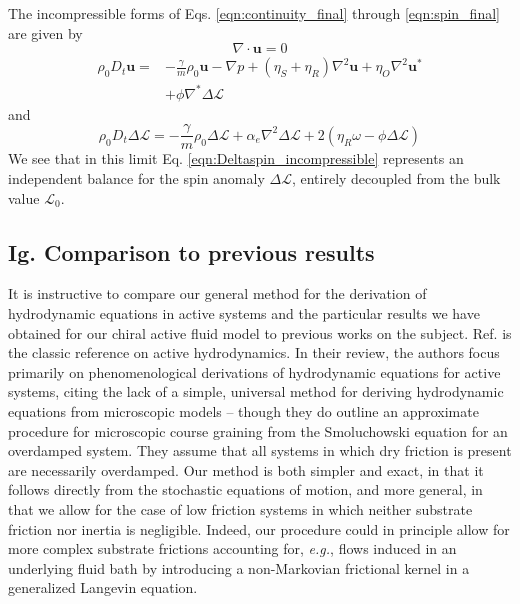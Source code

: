 \documentclass[%
 reprint,
superscriptaddress,
longbibliography,
 amsmath,amssymb,
 prl,
 citeautoscript,
]{revtex4-1}
\begin{document}
The incompressible forms of Eqs. \ref{eqn:continuity_final} through \ref{eqn:spin_final} are given by
\begin{equation}
\nabla \cdot {\boldsymbol u} = 0
\label{eqn:continuity_incompressible}
\end{equation}
\begin{equation}
\begin{split}
\rho_0 D_t {\boldsymbol u} = &- \frac{\gamma}{m} \rho_0 {\boldsymbol u} - \nabla p + \left( \eta_S + \eta_R \right) \nabla^2 {\boldsymbol u} + \eta_O \nabla^2 {\boldsymbol u}^* \\
&+ \phi \nabla^* \Delta \mathcal{L}
\end{split}
\label{eqn:momentum_incompressible}
\end{equation}
and
\begin{equation}
\rho_0 D_t \Delta \mathcal{L} = - \frac{\gamma}{m} \rho_0 \Delta \mathcal{L} + \alpha_e \nabla^2 \Delta \mathcal{L} + 2 \left( \eta_R \omega - \phi \Delta \mathcal{L} \right)
\label{eqn:Deltaspin_incompressible}
\end{equation}
We see that in this limit Eq. \ref{eqn:Deltaspin_incompressible} represents an independent balance for the spin anomaly $\Delta \mathcal{L}$, entirely decoupled from the bulk value $\mathcal{L}_0$.

\subsection{Ig. Comparison to previous results}

It is instructive to compare our general method for the derivation of hydrodynamic equations in active systems and the particular results we have obtained for our chiral active fluid model to previous works on the subject. Ref. \cite{joanny} is the classic reference on active hydrodynamics. In their review, the authors focus primarily on phenomenological derivations of hydrodynamic equations for active systems, citing the lack of a simple, universal method for deriving hydrodynamic equations from microscopic models -- though they do outline an approximate procedure for microscopic course graining from the Smoluchowski equation for an overdamped system. They assume that all systems in which dry friction is present are necessarily overdamped. Our method is both simpler and exact, in that it follows directly from the stochastic equations of motion, and more general, in that we allow for the case of low friction systems in which neither substrate friction nor inertia is negligible. Indeed, our procedure could in principle allow for more complex substrate frictions accounting for, {\it e.g.}, flows induced in an underlying fluid bath by introducing a non-Markovian frictional kernel in a generalized Langevin equation.
\end{document}
